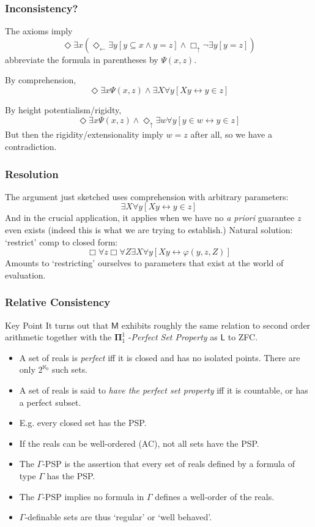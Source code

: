 \documentclass{beamer}
\newcommand{\du}{\Diamond_\uparrow}
\begin{document}
\begin{frame}
    \frametitle{Inconsistency?}
The axioms imply 
\[
    \Diamond \exists x (\Diamond_\leftarrow \exists y[y \subseteq x \wedge y = z] \wedge \Box_\uparrow \neg \exists y[y = z])
\]
abbreviate the formula in parentheses by $\Psi(x, z)$. 

By comprehension,
\[
    \Diamond \exists x \Psi(x, z) \wedge \exists X \forall y[Xy \leftrightarrow y \in z]
\]

By height potentialism/rigidty,
\[
    \Diamond \exists x \Psi(x, z) \wedge \du \exists w \forall y[y \in w \leftrightarrow y \in z]
\]
 But then the rigidity/extensionality imply $w = z$ after all, 
so we have a contradiction.
\end{frame}
\begin{frame}
    \frametitle{Resolution}
The argument just sketched uses comprehension with arbitrary parameters:
\[\exists X\forall y[Xy \leftrightarrow y \in z]\]
 And in the crucial application, it applies when we have no 
\emph{a priori} guarantee $z$ even exists (indeed this is what we are trying 
to establish.)
 Natural solution: `restrict' comp to closed form:
\[
    \Box \forall z \Box \forall Z \exists X \forall y[Xy \leftrightarrow \varphi(y, z, Z)]
\]
 Amounts to `restricting' ourselves to parameters that exist at 
the world of evaluation.
\end{frame}

\begin{frame}
    \frametitle{Relative Consistency}
\begin{block}{Key Point}
     It turns out that $\mathsf{M}$ exhibits roughly the same 
    relation to second order arithmetic together with the $\mathbf{\Pi}_1^1$
    -\emph{Perfect Set Property} as $\mathsf{L}$ to ZFC.
\end{block}
\begin{itemize}
    \item<3-> A set of reals is \emph{perfect} iff it is closed and has 
            no isolated points. There are only $2^{\aleph_0}$ such sets.
    \item<4-> A set of reals is said to \emph{have the perfect set property} iff it is 
            countable, or has a perfect subset.
    \item<5-> E.g. every closed set has the PSP.
    \item<6-> If the reals can be well-ordered (AC), not all sets have the PSP.
    \item<7-> The $\Gamma$-PSP is the assertion that every set of reals defined by a 
            formula of type $\Gamma$ has the PSP.
    \item<8-> The $\Gamma$-PSP implies no formula in $\Gamma$ defines a well-order of 
                the reals.
    \item<9-> $\Gamma$-definable sets are thus `regular' or `well behaved'.
\end{itemize}
\end{frame}
\end{document}
